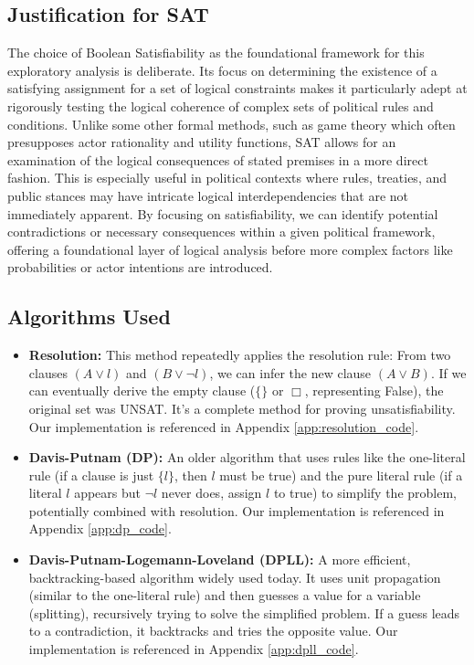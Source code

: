 \documentclass[11pt, a4paper]{article}
\begin{document}
\subsection*{Justification for SAT}
The choice of Boolean Satisfiability as the foundational framework for this exploratory analysis is deliberate. Its focus on determining the existence of a satisfying assignment for a set of logical constraints makes it particularly adept at rigorously testing the logical coherence of complex sets of political rules and conditions. Unlike some other formal methods, such as game theory which often presupposes actor rationality and utility functions, SAT allows for an examination of the logical consequences of stated premises in a more direct fashion. This is especially useful in political contexts where rules, treaties, and public stances may have intricate logical interdependencies that are not immediately apparent. By focusing on satisfiability, we can identify potential contradictions or necessary consequences within a given political framework, offering a foundational layer of logical analysis before more complex factors like probabilities or actor intentions are introduced.

\subsection*{Algorithms Used}

\begin{itemize}
    \item \textbf{Resolution:} This method \cite{Robinson1965} repeatedly applies the resolution rule: From two clauses $(A \vee l)$ and $(B \vee \neg l)$, we can infer the new clause $(A \vee B)$. If we can eventually derive the empty clause ($\{\}$ or $\Box$, representing False), the original set was UNSAT. It's a complete method for proving unsatisfiability. Our implementation is referenced in Appendix \ref{app:resolution_code}.
    \item \textbf{Davis-Putnam (DP):} An older algorithm \cite{DavisPutnam1960} that uses rules like the one-literal rule (if a clause is just $\{l\}$, then $l$ must be true) and the pure literal rule (if a literal $l$ appears but $\neg l$ never does, assign $l$ to true) to simplify the problem, potentially combined with resolution. Our implementation is referenced in Appendix \ref{app:dp_code}.
    \item \textbf{Davis-Putnam-Logemann-Loveland (DPLL):} A more efficient, backtracking-based algorithm \cite{DPLL1962} widely used today. It uses unit propagation (similar to the one-literal rule) and then guesses a value for a variable (splitting), recursively trying to solve the simplified problem. If a guess leads to a contradiction, it backtracks and tries the opposite value. Our implementation is referenced in Appendix \ref{app:dpll_code}.
\end{itemize}
\end{document}
